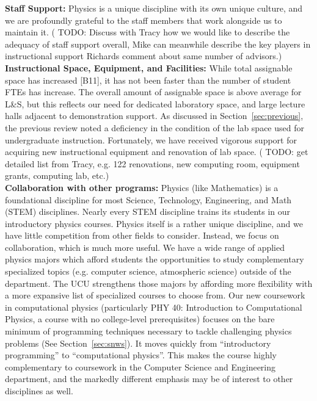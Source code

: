 \documentclass[12pt]{article}
\begin{document}
\noindent
{\bf Staff Support:}
Physics is a unique discipline with its own unique culture, and we are profoundly grateful to the staff members that work alongside us to maintain it.
({\color{red} TODO:  Discuss with Tracy how we would like to describe the adequacy of staff support overall, Mike can meanwhile describe the key players in instructional support}  Richards comment about same number of advisors.)\\[3pt]


\noindent
{\bf Instructional Space, Equipment, and Facilities:} While total
assignable space has increased [B11], it has not been faster than the
number of student FTEs has increase.  The overall amount of assignable
space is above average for L\&S, but this reflects our need for
dedicated laboratory space, and large lecture halls adjacent to
demonstration support.  As discussed in Section~\ref{sec:previous},
the previous review noted a deficiency in the condition of the lab
space used for undergraduate instruction.  Fortunately, we have
received vigorous support for acquiring new instructional equipment
and renovation of lab space.  ({\color{red} TODO: get detailed list
  from Tracy, e.g. 122 renovations, new computing room, equipment
  grants, computing lab, etc}.)\\[3pt]

\noindent
{\bf Collaboration with other programs: } Physics (like Mathematics)
is a foundational discipline for most Science, Technology,
Engineering, and Math (STEM) disciplines.  Nearly every STEM
discipline trains its students in our introductory physics courses.
Physics itself is a rather unique discipline, and we have little
competition from other fields to consider.  Instead, we focus on
collaboration, which is much more useful.  We have a wide range of
applied physics majors which afford students the opportunities to
study complementary specialized topics (e.g. computer science,
atmospheric science) outside of the department.  The UCU strengthens
those majors by affording more flexibility with a more expansive list
of specialized courses to choose from.  Our new coursework in
computational physics (particularly PHY 40: Introduction to
Computational Physics, a course with no college-level prerequisites)
focuses on the bare minimum of programming techniques necessary to
tackle challenging physics problems (See Section~\ref{sec:snws}).  It
moves quickly from ``introductory programming'' to
``computational physics''.  This makes the course highly complementary
to coursework in the Computer Science and Engineering department, and the markedly different emphasis may be of interest to other disciplines as well.\\[3pt]
\end{document}
